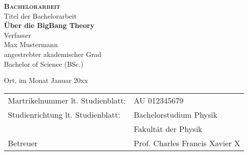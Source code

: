 %
%
\begin{center}
  {\Huge {\bfseries\scshape Bachelorarbeit}}\\
  \vspace*{2.cm}
  {\Large Titel der Bachelorarbeit}\linebreak\\
  {\huge {\bfseries Über die BigBang Theory}}\\
  \vspace*{2.75cm}
  {\Large Verfasser}\linebreak\\
  {\LARGE Max Mustermann}\\
  \vspace*{2.75cm}
  {\Large angestrebter akademischer Grad}\linebreak\\
  {\LARGE Bachelor of Science (BSc.)}
\end{center}
\vspace*{2.cm}

{\Large Ort, im Monat Januar 20xx}
\vspace*{2.cm}

{\Large
  {\def\arraystretch{1}\tabcolsep=10pt %
    \begin{tabular}{@{}ll} %
      Martrikelnummer lt. Studienblatt: & AU 012345679 \\
      \rule{0pt}{3ex}%
      Studienrichtung lt. Studienblatt: & Bachelorstudium Physik \\
                                        & Fakultät der Physik \\
      \rule{0pt}{3ex}%
      Betreuer & Prof. Charles Francis Xavier X
    \end{tabular}
  }
}
